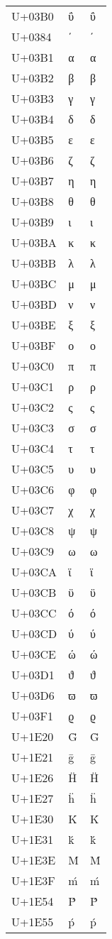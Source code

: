 \documentclass{article}
\begin{document}
\begin{longtable}{lll}
U+03B0 & ΰ & ΰ \\
U+0384 & ΄ & ΄ \\
U+03B1 & α & α \\
U+03B2 & β & β \\
U+03B3 & γ & γ \\
U+03B4 & δ & δ \\
U+03B5 & ε & ε \\
U+03B6 & ζ & ζ \\
U+03B7 & η & η \\
U+03B8 & θ & θ \\
U+03B9 & ι & ι \\
U+03BA & κ & κ \\
U+03BB & λ & λ \\
U+03BC & μ & μ \\
U+03BD & ν & ν \\
U+03BE & ξ & ξ \\
U+03BF & ο & ο \\
U+03C0 & π & π \\
U+03C1 & ρ & ρ \\
U+03C2 & ς & ς \\
U+03C3 & σ & σ \\
U+03C4 & τ & τ \\
U+03C5 & υ & υ \\
U+03C6 & φ & φ \\
U+03C7 & χ & χ \\
U+03C8 & ψ & ψ \\
U+03C9 & ω & ω \\
U+03CA & ϊ & ϊ \\
U+03CB & ϋ & ϋ \\
U+03CC & ό & ό \\
U+03CD & ύ & ύ \\
U+03CE & ώ & ώ \\
U+03D1 & ϑ & ϑ \\
U+03D6 & ϖ & ϖ \\
U+03F1 & ϱ & ϱ \\
U+1E20 & Ḡ & Ḡ \\
U+1E21 & ḡ & ḡ \\
U+1E26 & Ḧ & Ḧ \\
U+1E27 & ḧ & ḧ \\
U+1E30 & Ḱ & Ḱ \\
U+1E31 & ḱ & ḱ \\
U+1E3E & Ḿ & Ḿ \\
U+1E3F & ḿ & ḿ \\
U+1E54 & Ṕ & Ṕ \\
U+1E55 & ṕ & ṕ \\

\end{longtable}
\end{document}
